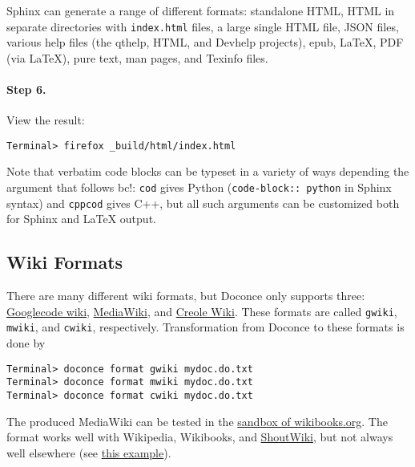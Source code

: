 \documentclass[%
oneside,                 %
final,                   %
10pt]{article}
\begin{document}
Sphinx can generate a range of different formats:
standalone HTML, HTML in separate directories with {\fontsize{10pt}{10pt}\Verb!index.html!} files,
a large single HTML file, JSON files, various help files (the qthelp, HTML,
and Devhelp projects), epub, {\LaTeX}, PDF (via {\LaTeX}), pure text, man pages,
and Texinfo files.

\paragraph{Step 6.}
View the result:
\vspace{4pt}
\begin{Verbatim}[numbers=none,frame=lines,label=\fbox{{\tiny Terminal}},fontsize=\fontsize{9pt}{9pt},
labelposition=topline,framesep=2.5mm,framerule=0.7pt]
Terminal> firefox _build/html/index.html
\end{Verbatim}

Note that verbatim code blocks can be typeset in a variety of ways
depending the argument that follows {\fontsize{10pt}{10pt}\Verb!!bc!}: {\fontsize{10pt}{10pt}\Verb!cod!} gives Python
({\fontsize{10pt}{10pt}\Verb!code-block:: python!} in Sphinx syntax) and {\fontsize{10pt}{10pt}\Verb!cppcod!} gives C++, but
all such arguments can be customized both for Sphinx and {\LaTeX} output.


\subsection{Wiki Formats}

There are many different wiki formats, but Doconce only supports three:
\href{{http://code.google.com/p/support/wiki/WikiSyntax}}{Googlecode wiki},
\href{{http://www.mediawiki.org/wiki/Help:Formatting}}{MediaWiki}, and
\href{{http://www.wikicreole.org/wiki/Creole1.0}}{Creole Wiki}.
These formats are called
{\fontsize{10pt}{10pt}\Verb!gwiki!}, {\fontsize{10pt}{10pt}\Verb!mwiki!}, and {\fontsize{10pt}{10pt}\Verb!cwiki!}, respectively.
Transformation from Doconce to these formats is done by
\vspace{4pt}
\begin{Verbatim}[numbers=none,frame=lines,label=\fbox{{\tiny Terminal}},fontsize=\fontsize{9pt}{9pt},
labelposition=topline,framesep=2.5mm,framerule=0.7pt]
Terminal> doconce format gwiki mydoc.do.txt
Terminal> doconce format mwiki mydoc.do.txt
Terminal> doconce format cwiki mydoc.do.txt
\end{Verbatim}

The produced MediaWiki can be tested in the \href{{http://en.wikibooks.org/wiki/Sandbox}}{sandbox of
wikibooks.org}. The format
works well with Wikipedia, Wikibooks, and
\href{{http://doconcedemo.shoutwiki.com/wiki/Doconce_demo_page}}{ShoutWiki},
but not always well elsewhere
(see \href{{http://doconcedemo.jumpwiki.com/wiki/First_demo}}{this example}).
\end{document}
